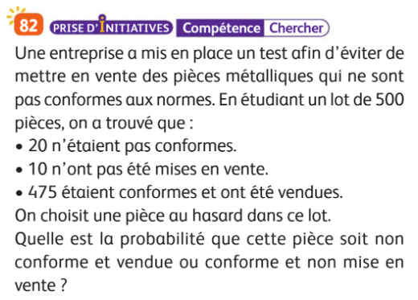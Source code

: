 \documentclass{article}
\begin{document}
\begin{center}
\begin{minipage}{0.40\textwidth}
\includegraphics[width=\textwidth]{Exercice_2.png}
\end{minipage}
\end{center}
\end{document}
